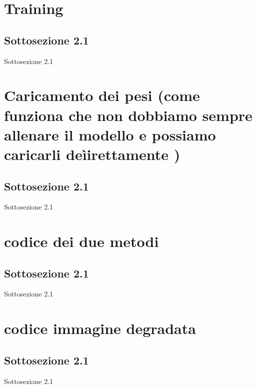 \documentclass[11pt]{beamer}
\begin{document}
\section{Training} %
\subsection{Sottosezione 2.1}
\begin{frame}{Sottosezione 2.1}
\end{frame}

\section{Caricamento dei pesi (come funziona che non dobbiamo sempre allenare il modello e possiamo caricarli deìirettamente )} 
\subsection{Sottosezione 2.1}
\begin{frame}{Sottosezione 2.1}
\end{frame}

\section{codice dei due metodi} 
\subsection{Sottosezione 2.1}
\begin{frame}{Sottosezione 2.1}
\end{frame}

\section{codice immagine degradata} 
\subsection{Sottosezione 2.1}
\begin{frame}{Sottosezione 2.1}
\end{frame}
\end{document}
